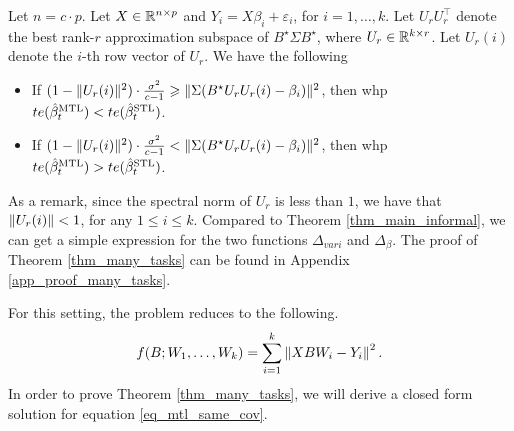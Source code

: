 \begin{theorem}\label{thm_many_tasks}
	Let $n = c \cdot p$.
	Let $X\in\mathbb{R}^{n\times p}$ and $Y_i = X\beta_i + \varepsilon_i$, for $i = 1,\dots,k$.
	Let $U_r U_r^{\top}$ denote the best rank-$r$ approximation subspace of $B^{\star}\Sigma B^{\star}$, where $U_r\in\mathbb{R}^{k\times r}$.
	Let $U_r(i)$ denote the $i$-th row vector of $U_r$.
	We have the following
	\begin{itemize}
		\item If $(1 - \|U_r(i)\|^2)\cdot \frac{\sigma^2}{c - 1} \geqslant \|\Sigma (B^{\star} U_r U_r(i) - \beta_i)\|^2$, then whp $te(\hat{\beta}_t^{\text{MTL}}) < te(\hat{\beta}_t^{\text{STL}})$.
		\item If $(1 - \|U_r(i)\|^2)\cdot \frac{\sigma^2}{c - 1} < \|\Sigma(B^{\star} U_r U_r(i) - \beta_i)\|^2$, then whp $te(\hat{\beta}_t^{\text{MTL}}) > te(\hat{\beta}_t^{\text{STL}})$.
	\end{itemize}
\end{theorem}
As a remark, since the spectral norm of $U_r$ is less than $1$, we have that $\|U_r(i)\| < 1$, for any $1 \le i \le k$. Compared to Theorem \ref{thm_main_informal}, we can get a simple expression for the two functions $\Delta_{vari}$ and $\Delta_{\beta}$. The proof of Theorem \ref{thm_many_tasks} can be found in Appendix \ref{app_proof_many_tasks}.




For this setting, the problem reduces to the following.
\begin{align}
	f(B; W_1, \dots, W_k) = \sum_{i=1}^k \left\| X B W_i - Y_i \right\|^2. \label{eq_mtl_same_cov}
\end{align}
In order to prove Theorem \ref{thm_many_tasks}, we will derive a closed form solution for equation \eqref{eq_mtl_same_cov}.

